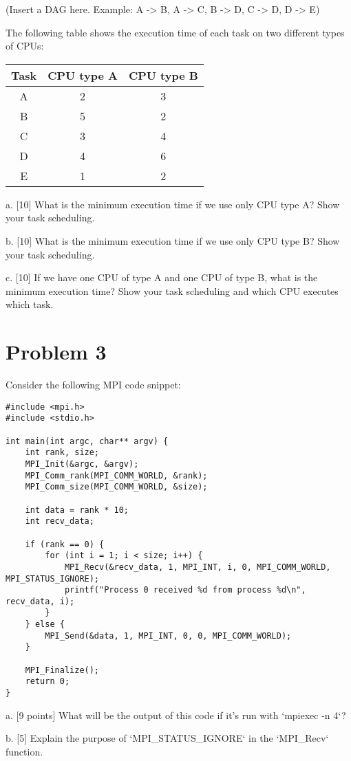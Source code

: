 \documentclass{article}
\begin{document}
(Insert a DAG here.  Example: A -> B, A -> C, B -> D, C -> D, D -> E)

The following table shows the execution time of each task on two different types of CPUs:

\begin{tabular}{|c|c|c|}
\hline
Task & CPU type A & CPU type B \\ \hline
A & 2 & 3 \\ \hline
B & 5 & 2 \\ \hline
C & 3 & 4 \\ \hline
D & 4 & 6 \\ \hline
E & 1 & 2 \\ \hline
\end{tabular}

a. [10] What is the minimum execution time if we use only CPU type A? Show your task scheduling.

b. [10] What is the minimum execution time if we use only CPU type B? Show your task scheduling.

c. [10]  If we have one CPU of type A and one CPU of type B, what is the minimum execution time? Show your task scheduling and which CPU executes which task.


\section*{Problem 3}
Consider the following MPI code snippet:

\begin{verbatim}
#include <mpi.h>
#include <stdio.h>

int main(int argc, char** argv) {
    int rank, size;
    MPI_Init(&argc, &argv);
    MPI_Comm_rank(MPI_COMM_WORLD, &rank);
    MPI_Comm_size(MPI_COMM_WORLD, &size);

    int data = rank * 10;
    int recv_data;

    if (rank == 0) {
        for (int i = 1; i < size; i++) {
            MPI_Recv(&recv_data, 1, MPI_INT, i, 0, MPI_COMM_WORLD, MPI_STATUS_IGNORE);
            printf("Process 0 received %d from process %d\n", recv_data, i);
        }
    } else {
        MPI_Send(&data, 1, MPI_INT, 0, 0, MPI_COMM_WORLD);
    }

    MPI_Finalize();
    return 0;
}
\end{verbatim}

a. [9 points] What will be the output of this code if it's run with `mpiexec -n 4`?

b. [5]  Explain the purpose of `MPI_STATUS_IGNORE` in the `MPI_Recv` function.
\end{document}
